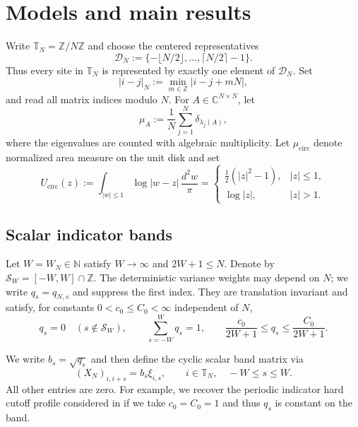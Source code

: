 \documentclass[11pt,reqno]{amsart}
\numberwithin{equation}{section}
\theoremstyle{definition}
\theoremstyle{remark}
\newcommand{\C}{\mathbb C}
\newcommand{\T}{\mathbb T}
\newcommand{\1}{\mathbf 1}
\newcommand{\cir}{\mathrm{circ}}
\begin{document}
\section{Models and main results}
\label{sec:model}

Write $\T_N=\mathbb Z/N\mathbb Z$ and choose the centered representatives
\[
 \mathcal D_N:=\{-\lfloor N/2\rfloor,\ldots,\lceil N/2\rceil-1\}.
\]
Thus every site in $\T_N$ is represented by exactly one element of
$\mathcal D_N$.  Set
\[
 |i-j|_N:=\min_{m\in\mathbb Z}|i-j+mN|,
\]
and read all matrix indices modulo $N$.  For $A\in\C^{N\times N}$, let
\[
 \mu_A:=\frac1N\sum_{j=1}^N\delta_{\lambda_j(A)},
\]
where the eigenvalues are counted with algebraic multiplicity.  Let
\(\mu_{\cir}\) denote normalized area measure on the unit disk and set
\begin{equation}\label{eq:circular-potential}
 U_{\cir}(z):=\int_{|w|\le1}\log|w-z|\,\frac{d^2w}{\pi}
 =\begin{cases}
 \frac12(|z|^2-1),&|z|\le1,\\[2mm]
 \log|z|,&|z|>1.
 \end{cases}
\end{equation}

\subsection{Scalar indicator bands}

Let $W=W_N\in\mathbb N$ satisfy $W\to\infty$ and $2W+1\le N$.  Denote by
\(\mathcal S_W=[-W,W]\cap\mathbb Z\).  The deterministic variance weights
may depend on $N$; we write $q_s=q_{N,s}$ and suppress the first index.
They are translation invariant and satisfy, for constants
$0<c_0\le C_0<\infty$ independent of $N$,
\begin{equation}\label{eq:indicator-weights}
 q_s=0\quad(s\notin\mathcal S_W),\qquad
 \sum_{s=-W}^Wq_s=1,\qquad
 \frac{c_0}{2W+1}\le q_s\le\frac{C_0}{2W+1}.
\end{equation}


We write $b_s=\sqrt{q_s}$ and then define the cyclic scalar band matrix via
\begin{equation}\label{eq:indicator-model}
 (X_N)_{i,i+s}=b_s\xi_{i,s},\qquad i\in\T_N,\quad -W\le s\le W.
\end{equation}
All other entries are zero. For example, we recover the periodic indicator hard cutoff profile considered in \cite{Tikhomirov2023} if we take $c_0=C_0=1$ and thus $q_s$ is constant on the band.
\end{document}
